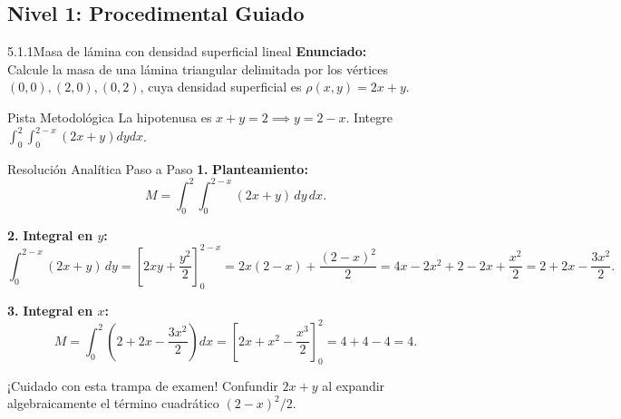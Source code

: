 \documentclass[11pt,a4paper]{article}
\begin{document}
\subsection{Nivel 1: Procedimental Guiado}

\begin{nivelbox}{5.1.1}{Masa de lámina con densidad superficial lineal}
\textbf{Enunciado:}\\
Calcule la masa de una lámina triangular delimitada por los vértices $(0,0), (2,0), (0,2)$, cuya densidad superficial es $\rho(x,y) = 2x + y$.

\begin{observacionbox}{Pista Metodológica}
La hipotenusa es $x + y = 2 \implies y = 2 - x$. Integre $\int_0^2 \int_0^{2-x} (2x + y) dy dx$.
\end{observacionbox}

\begin{ejerciciobox}{Resolución Analítica Paso a Paso}
\smallskip\noindent\textbf{1.} \textbf{Planteamiento:}
\[M = \int_0^2 \int_0^{2-x} (2x + y) \, dy \, dx.\]

\smallskip\noindent\textbf{2.} \textbf{Integral en $y$:}
\[\int_0^{2-x} (2x + y) \, dy = \left[ 2xy + \frac{y^2}{2} \right]_0^{2-x} = 2x(2 - x) + \frac{(2 - x)^2}{2} = 4x - 2x^2 + 2 - 2x + \frac{x^2}{2} = 2 + 2x - \frac{3x^2}{2}.\]

\smallskip\noindent\textbf{3.} \textbf{Integral en $x$:}
\[M = \int_0^2 \left( 2 + 2x - \frac{3x^2}{2} \right) dx = \left[ 2x + x^2 - \frac{x^3}{2} \right]_0^2 = 4 + 4 - 4 = 4.\]
\end{ejerciciobox}

\begin{errorbox}{¡Cuidado con esta trampa de examen!}
Confundir $2x+y$ al expandir algebraicamente el término cuadrático $(2-x)^2/2$.
\end{errorbox}
\end{nivelbox}
\bigskip
\end{document}
